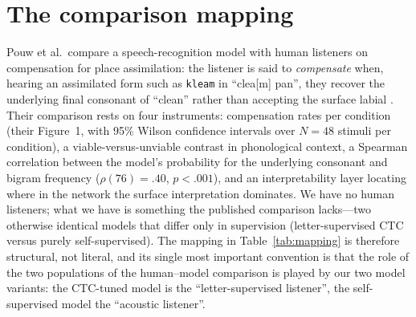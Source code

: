 \documentclass[11pt,a4paper]{article}
\newcommand{\sampa}[1]{\texttt{#1}}
\begin{document}
\section{The comparison mapping}
\label{sec:mapping}

Pouw et al.\ compare a speech-recognition model with human listeners
on compensation for place assimilation: the listener is said to
\emph{compensate} when, hearing an assimilated form such as
\sampa{kleam} in ``clea[m] pan'', they recover the underlying final
consonant of ``clean'' rather than accepting the surface labial
\citep{gaskell1996, gaow2002, darcy2009}. Their
comparison rests on four instruments: compensation rates per condition
(their Figure~1, with 95\% Wilson confidence intervals over $N=48$
stimuli per condition), a viable-versus-unviable contrast in
phonological context, a Spearman correlation between the model's
probability for the underlying consonant and bigram frequency
($\rho(76)=.40$, $p<.001$), and an interpretability layer locating
where in the network the surface interpretation dominates. We have no
human listeners; what we have is something the published comparison
lacks---two otherwise identical models that differ only in supervision
(letter-supervised CTC versus purely self-supervised). The mapping in
Table~\ref{tab:mapping} is therefore structural, not literal, and its
single most important convention is that the role of the two
populations of the human--model comparison is played by our two model
variants: the CTC-tuned model is the ``letter-supervised listener'',
the self-supervised model the ``acoustic listener''.
\end{document}
